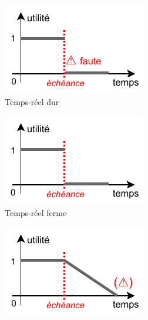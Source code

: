 \documentclass[french, a4paper, 11pt, twoside, pdftex]{StyleThese}
\begin{document}
		\begin{figure}[ht]
			\centering
			\begin{subfigure}{.3\textwidth} \centering
				\includegraphics[width=\linewidth]{schemas/SdF_TempsReelDUR}
				\caption[]{Temps-réel dur}
				\label{fig:tempReelDur}
			\end{subfigure}
			\begin{subfigure}{.3\textwidth} \centering
				\includegraphics[width=\linewidth]{schemas/SdF_TempsReelFERME}
				\caption[]{Temps-réel ferme}
				\label{fig:tempReelFerme}
			\end{subfigure}
			\begin{subfigure}{.3\textwidth} \centering
				\includegraphics[width=\linewidth]{schemas/SdF_TempsReelMOU}

\end{subfigure}
\end{figure}
\end{document}
